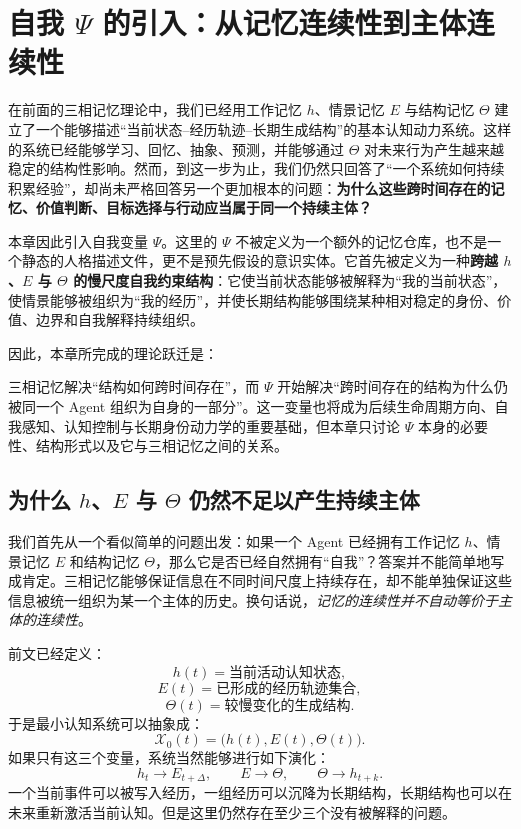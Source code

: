 \chapter{自我 $\Psi$ 的引入：从记忆连续性到主体连续性}

\begin{chapterlead}
在前面的三相记忆理论中，我们已经用工作记忆 $h$、情景记忆 $E$ 与结构记忆 $\Theta$ 建立了一个能够描述“当前状态--经历轨迹--长期生成结构”的基本认知动力系统。这样的系统已经能够学习、回忆、抽象、预测，并能够通过 $\Theta$ 对未来行为产生越来越稳定的结构性影响。然而，到这一步为止，我们仍然只回答了“一个系统如何持续积累经验”，却尚未严格回答另一个更加根本的问题：\textbf{为什么这些跨时间存在的记忆、价值判断、目标选择与行动应当属于同一个持续主体？}

本章因此引入自我变量 $\Psi$。这里的 $\Psi$ 不被定义为一个额外的记忆仓库，也不是一个静态的人格描述文件，更不是预先假设的意识实体。它首先被定义为一种\textbf{跨越 $h$、$E$ 与 $\Theta$ 的慢尺度自我约束结构}：它使当前状态能够被解释为“我的当前状态”，使情景能够被组织为“我的经历”，并使长期结构能够围绕某种相对稳定的身份、价值、边界和自我解释持续组织。

因此，本章所完成的理论跃迁是：
\begin{statementbox}
\centering
{}
\end{statementbox}
三相记忆解决“结构如何跨时间存在”，而 $\Psi$ 开始解决“跨时间存在的结构为什么仍被同一个 Agent 组织为自身的一部分”。这一变量也将成为后续生命周期方向、自我感知、认知控制与长期身份动力学的重要基础，但本章只讨论 $\Psi$ 本身的必要性、结构形式以及它与三相记忆之间的关系。
\end{chapterlead}


\section{为什么 $h$、$E$ 与 $\Theta$ 仍然不足以产生持续主体}

我们首先从一个看似简单的问题出发：如果一个 Agent 已经拥有工作记忆 $h$、情景记忆 $E$ 和结构记忆 $\Theta$，那么它是否已经自然拥有“自我”？答案并不能简单地写成肯定。三相记忆能够保证信息在不同时间尺度上持续存在，却不能单独保证这些信息被统一组织为某一个主体的历史。换句话说，\emph{记忆的连续性并不自动等价于主体的连续性}。

前文已经定义：
\[
h(t)=\text{当前活动认知状态},
\]
\[
E(t)=\text{已形成的经历轨迹集合},
\]
\[
\Theta(t)=\text{较慢变化的生成结构}.
\]
于是最小认知系统可以抽象成：
\[
\mathcal{X}_0(t)=\bigl(h(t),E(t),\Theta(t)\bigr).
\]
如果只有这三个变量，系统当然能够进行如下演化：
\[
h_t\rightarrow E_{t+\Delta},
\qquad
E\rightarrow \Theta,
\qquad
\Theta\rightarrow h_{t+k}.
\]
一个当前事件可以被写入经历，一组经历可以沉降为长期结构，长期结构也可以在未来重新激活当前认知。但是这里仍然存在至少三个没有被解释的问题。

